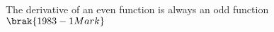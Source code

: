 \iffalse
  \title{Assignment}
  \author{Kotha Pratheek Reddy}
  \section{true-false}
\fi
    \item The derivative of an even function is always an odd function $\hfill\brak{1983-1 Mark}$


